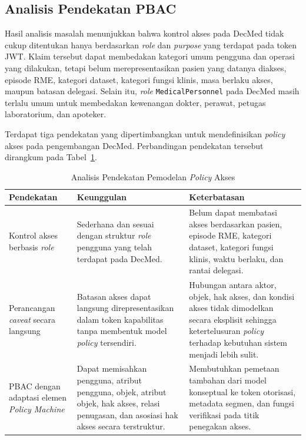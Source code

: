 \subsection{Analisis Pendekatan PBAC}
\label{subsec:analisis-pendekatan-model-pbac}

Hasil analisis masalah menunjukkan bahwa kontrol akses pada DecMed tidak cukup ditentukan hanya berdasarkan \textit{role} dan \textit{purpose} yang terdapat pada token JWT. Klaim tersebut dapat membedakan kategori umum pengguna dan operasi yang dilakukan, tetapi belum merepresentasikan pasien yang datanya diakses, episode RME, kategori dataset, kategori fungsi klinis, masa berlaku akses, maupun batasan delegasi. Selain itu, \textit{role} \texttt{MedicalPersonnel} pada DecMed masih terlalu umum untuk membedakan kewenangan dokter, perawat, petugas laboratorium, dan apoteker.

Terdapat tiga pendekatan yang dipertimbangkan untuk mendefinisikan \textit{policy} akses pada pengembangan DecMed. Perbandingan pendekatan tersebut dirangkum pada Tabel~\ref{tab:analisis-pendekatan-model-kebijakan}.

\begin{table}[H]
	\centering
	\caption{Analisis Pendekatan Pemodelan \textit{Policy} Akses}
	\label{tab:analisis-pendekatan-model-kebijakan}
	\small
	\begin{tabular}{|p{}|p{}|p{}|}
		\hline
		\textbf{Pendekatan}
		 & \textbf{Keunggulan}
		 & \textbf{Keterbatasan}                                                                                                                                                               \\ \hline

		Kontrol akses berbasis \textit{role}
		 & Sederhana dan sesuai dengan struktur \textit{role} pengguna yang telah terdapat pada DecMed.
		 & Belum dapat membatasi akses berdasarkan pasien, episode RME, kategori dataset, kategori fungsi klinis, waktu berlaku, dan rantai delegasi.                                          \\ \hline

		Perancangan \textit{caveat} secara langsung
		 & Batasan akses dapat langsung direpresentasikan dalam token kapabilitas tanpa membentuk model \textit{policy} tersendiri.
		 & Hubungan antara aktor, objek, hak akses, dan kondisi akses tidak dimodelkan secara eksplisit sehingga ketertelusuran \textit{policy} terhadap kebutuhan sistem menjadi lebih sulit. \\ \hline

		PBAC dengan adaptasi elemen \textit{Policy Machine}
		 & Dapat memisahkan pengguna, atribut pengguna, objek, atribut objek, hak akses, relasi penugasan, dan asosiasi hak akses secara terstruktur.
		 & Membutuhkan pemetaan tambahan dari model konseptual ke token otorisasi, metadata segmen, dan fungsi verifikasi pada titik penegakan akses.                                          \\ \hline
	\end{tabular}

\end{table}


